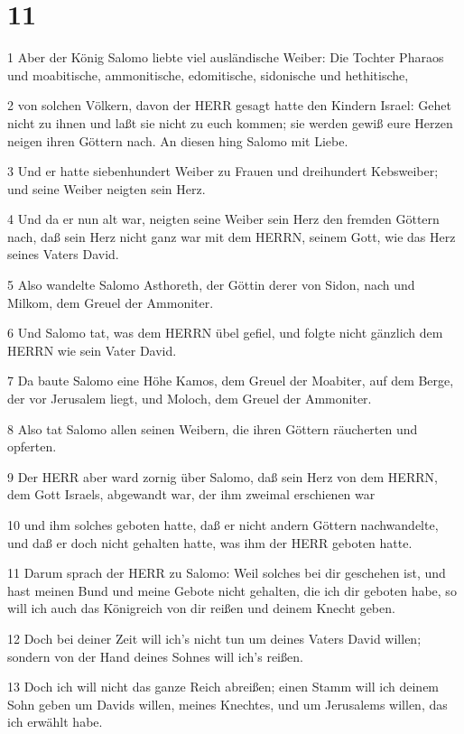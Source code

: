 \chapter{11}

\par 1 Aber der König Salomo liebte viel ausländische Weiber: Die Tochter Pharaos und moabitische, ammonitische, edomitische, sidonische und hethitische,
\par 2 von solchen Völkern, davon der HERR gesagt hatte den Kindern Israel: Gehet nicht zu ihnen und laßt sie nicht zu euch kommen; sie werden gewiß eure Herzen neigen ihren Göttern nach. An diesen hing Salomo mit Liebe.
\par 3 Und er hatte siebenhundert Weiber zu Frauen und dreihundert Kebsweiber; und seine Weiber neigten sein Herz.
\par 4 Und da er nun alt war, neigten seine Weiber sein Herz den fremden Göttern nach, daß sein Herz nicht ganz war mit dem HERRN, seinem Gott, wie das Herz seines Vaters David.
\par 5 Also wandelte Salomo Asthoreth, der Göttin derer von Sidon, nach und Milkom, dem Greuel der Ammoniter.
\par 6 Und Salomo tat, was dem HERRN übel gefiel, und folgte nicht gänzlich dem HERRN wie sein Vater David.
\par 7 Da baute Salomo eine Höhe Kamos, dem Greuel der Moabiter, auf dem Berge, der vor Jerusalem liegt, und Moloch, dem Greuel der Ammoniter.
\par 8 Also tat Salomo allen seinen Weibern, die ihren Göttern räucherten und opferten.
\par 9 Der HERR aber ward zornig über Salomo, daß sein Herz von dem HERRN, dem Gott Israels, abgewandt war, der ihm zweimal erschienen war
\par 10 und ihm solches geboten hatte, daß er nicht andern Göttern nachwandelte, und daß er doch nicht gehalten hatte, was ihm der HERR geboten hatte.
\par 11 Darum sprach der HERR zu Salomo: Weil solches bei dir geschehen ist, und hast meinen Bund und meine Gebote nicht gehalten, die ich dir geboten habe, so will ich auch das Königreich von dir reißen und deinem Knecht geben.
\par 12 Doch bei deiner Zeit will ich's nicht tun um deines Vaters David willen; sondern von der Hand deines Sohnes will ich's reißen.
\par 13 Doch ich will nicht das ganze Reich abreißen; einen Stamm will ich deinem Sohn geben um Davids willen, meines Knechtes, und um Jerusalems willen, das ich erwählt habe.
